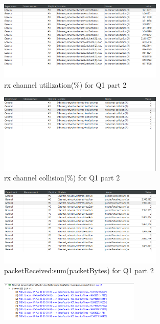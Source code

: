 \begin{qsolve}
\begin{qsolve}[]
        \splitqsolve[\splitqsolve]
        \begin{figure}[H]
            \centering
            \includegraphics[width=0.7\textwidth]{output6.png}
            \caption{rx channel utilization(\%) for Q1 part 2}
        \end{figure}
        \begin{figure}[H]
            \centering
            \includegraphics[width=0.7\textwidth]{output7.png}
            \caption{rx channel collision(\%) for Q1 part 2}
        \end{figure}
        \begin{figure}[H]
            \centering
            \includegraphics[width=0.7\textwidth]{output8.png}
            \caption{packetReceived:sum(packetBytes) for Q1 part 2}
        \end{figure}
        \begin{figure}[H]
            \centering
            \includegraphics[width=0.6\textwidth]{output9.png}

\end{figure}
\end{qsolve}
\end{qsolve}
